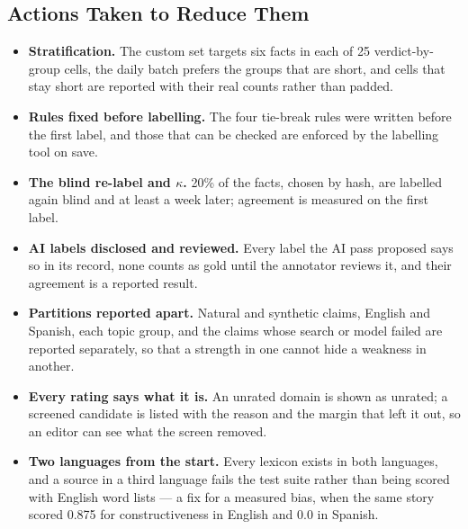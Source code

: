 
\subsection{Actions Taken to Reduce Them}

\begin{itemize}
    \item \textbf{Stratification.} The custom set targets six facts in
    each of 25 verdict-by-group cells, the daily batch prefers the
    groups that are short, and cells that stay short are reported with
    their real counts rather than padded.
    \item \textbf{Rules fixed before labelling.} The four tie-break rules
    were written before the first label, and those that can be checked
    are enforced by the labelling tool on save.
    \item \textbf{The blind re-label and $\kappa$.} 20\% of the facts,
    chosen by hash, are labelled again blind and at least a week later;
    agreement is measured on the first label.
    \item \textbf{AI labels disclosed and reviewed.} Every label the AI
    pass proposed says so in its record, none counts as gold until the
    annotator reviews it, and their agreement is a reported result.
    \item \textbf{Partitions reported apart.} Natural and synthetic
    claims, English and Spanish, each topic group, and the claims whose
    search or model failed are reported separately, so that a strength
    in one cannot hide a weakness in another.
    \item \textbf{Every rating says what it is.} An unrated domain is
    shown as unrated; a screened candidate is listed with the reason and
    the margin that left it out, so an editor can see what the screen
    removed.
    \item \textbf{Two languages from the start.} Every lexicon exists in
    both languages, and a source in a third language fails the test
    suite rather than being scored with English word lists --- a fix for
    a measured bias, when the same story scored 0.875 for
    constructiveness in English and 0.0 in Spanish.
\end{itemize}
